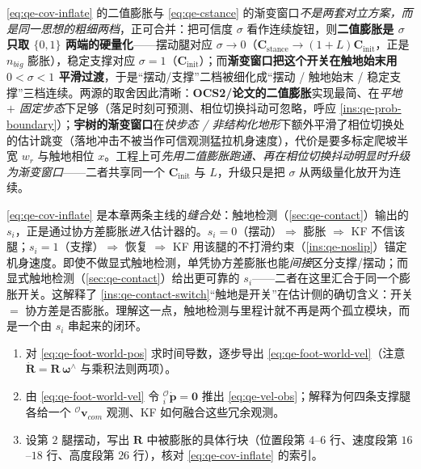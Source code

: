 \begin{insight}\label{ins:qe-cov-graded}
\cref{eq:qe-cov-inflate} 的二值膨胀与 \cref{eq:qe-cstance} 的渐变窗口\emph{不是两套对立方案，而是同一思想的粗细两档}，正可合并：把可信度 $\sigma$ 看作连续旋钮，则\textbf{二值膨胀是 $\sigma$ 只取 $\{0,1\}$ 两端的硬量化}——摆动腿对应 $\sigma\to0$（$\mathbf{C}_{\mathrm{stance}}\to(1+L)\mathbf{C}_{\mathrm{init}}$，正是 $n_{big}$ 膨胀），稳定支撑对应 $\sigma=1$（$\mathbf{C}_{\mathrm{init}}$）；而\textbf{渐变窗口把这个开关在触地始末用 $0<\sigma<1$ 平滑过渡}，于是“摆动/支撑”二档被细化成“摆动 / 触地始末 / 稳定支撑”三档连续。两源的取舍因此清晰：\textbf{OCS2/论文的二值膨胀}实现最简、在\emph{平地 $+$ 固定步态}下足够（落足时刻可预测、相位切换抖动可忽略，呼应 \cref{ins:qe-prob-boundary}）；\textbf{宇树的渐变窗口}在\emph{快步态 / 非结构化地形}下额外平滑了相位切换处的估计跳变（落地冲击不被当作可信观测猛拉机身速度），代价是要多标定爬坡半宽 $w_r$ 与触地相位 $x$。工程上可\emph{先用二值膨胀跑通、再在相位切换抖动明显时升级为渐变窗口}——二者共享同一个 $\mathbf{C}_{\mathrm{init}}$ 与 $L$，升级只是把 $\sigma$ 从两级量化放开为连续。
\end{insight}

\begin{insight}[协方差膨胀 $=$ 触地检测在滤波器里的落地点（耦合 §触地 $\leftrightarrow$ §里程计）]\label{ins:qe-cov-couple}
\cref{eq:qe-cov-inflate} 是本章两条主线的\emph{缝合处}：触地检测（\cref{sec:qe-contact}）输出的 $s_i$，正是通过协方差膨胀\emph{进入}估计器的。$s_i=0$（摆动）$\Rightarrow$ 膨胀 $\Rightarrow$ KF 不信该腿；$s_i=1$（支撑）$\Rightarrow$ 恢复 $\Rightarrow$ KF 用该腿的不打滑约束（\cref{ins:qe-noslip}）锚定机身速度。即使不做显式触地检测，单凭协方差膨胀也能\emph{间接}区分支撑/摆动；而显式触地检测（\cref{sec:qe-contact}）给出更可靠的 $s_i$——二者在这里汇合于同一个膨胀开关。这解释了 \cref{ins:qe-contact-switch}“触地是开关”在估计侧的确切含义：开关 $=$ 协方差是否膨胀。理解这一点，触地检测与里程计就不再是两个孤立模块，而是一个由 $s_i$ 串起来的闭环。
\end{insight}

\begin{practice}
\begin{enumerate}
  \item 对 \cref{eq:qe-foot-world-pos} 求时间导数，逐步导出 \cref{eq:qe-foot-world-vel}（注意 $\dot{\mathbf{R}}=\mathbf{R}\,\boldsymbol\omega^\wedge$ 与乘积法则两项）。
  \item 由 \cref{eq:qe-foot-world-vel} 令 ${}^{\mathcal{O}}_{i}\dot{\boldsymbol p}=\boldsymbol 0$ 推出 \cref{eq:qe-vel-obs}；解释为何四条支撑腿各给一个 ${}^{\mathcal{O}}\boldsymbol v_{com}$ 观测、KF 如何融合这些冗余观测。
  \item 设第 $2$ 腿摆动，写出 $\mathbf{R}$ 中被膨胀的具体行块（位置段第 $4$--$6$ 行、速度段第 $16$--$18$ 行、高度段第 $26$ 行），核对 \cref{eq:qe-cov-inflate} 的索引。
\end{enumerate}
\end{practice}

